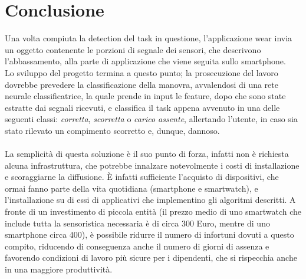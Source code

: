\documentclass[a4paper, oneside]{book}
\begin{document}
	\chapter{Conclusione}
Una volta compiuta la detection del task in questione, l'applicazione wear invia un oggetto contenente le porzioni di segnale dei sensori, che descrivono l'abbassamento, alla parte di applicazione che viene seguita sullo smartphone. \\
Lo sviluppo del progetto termina a questo punto; la prosecuzione del lavoro dovrebbe prevedere la classificazione della manovra, avvalendosi di una rete neurale classificatrice, la quale prende in input le feature, dopo che sono state estratte dai segnali ricevuti, e classifica il task appena avvenuto in una delle seguenti classi: \textit{corretta}, \textit{scorretta} o \textit{carico assente}, allertando l'utente, in caso sia stato rilevato un compimento scorretto e, dunque, dannoso. \\ \\
La semplicità di questa soluzione è il suo punto di forza, infatti non è richiesta alcuna infrastruttura, che potrebbe innalzare notevolmente i costi di installazione e scoraggiarne la diffusione. È infatti sufficiente l’acquisto di dispositivi, che ormai fanno parte della vita quotidiana (smartphone e smartwatch), e l’installazione su di essi di applicativi che implementino gli algoritmi descritti.
A fronte di un investimento di piccola entità (il prezzo medio di uno smartwatch che include tutta la sensoristica necessaria è di circa 300 Euro, mentre di uno smartphone circa 400), è possibile ridurre il numero di infortuni dovuti a questo compito, riducendo di conseguenza anche il numero di giorni di assenza e favorendo condizioni di lavoro più sicure per i dipendenti, che si rispecchia anche in una maggiore produttività.

\clearpage
\end{document}
